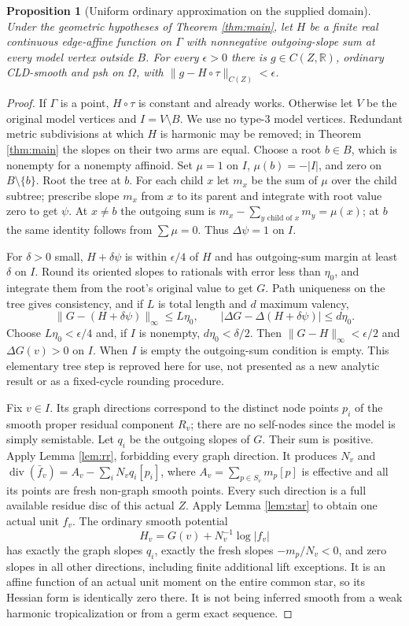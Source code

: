 \documentclass[11pt]{article}
\newtheorem{proposition}[theorem]{Proposition}
\begin{document}
\begin{proposition}[Uniform ordinary approximation on the supplied domain]\label{prop:raw}
Under the geometric hypotheses of Theorem \ref{thm:main}, let $H$
be a finite real continuous edge-affine function on $\Gamma$ with
nonnegative outgoing-slope sum at every model vertex outside $B$.
For every $\epsilon>0$ there is $g\in C(Z,\mathbb{R})$, ordinary
CLD-smooth and psh on $\Omega$, with
$\|g-H\circ\tau\|_{C(Z)}<\epsilon$.
\end{proposition}
\begin{proof}
If $\Gamma$ is a point, $H\circ\tau$ is constant and already
works. Otherwise let $V$ be the original model vertices and
$I=V\setminus B$. We use no type-3 model vertices. Redundant
metric subdivisions at which $H$ is harmonic may be removed;
in Theorem \ref{thm:main} the slopes on their two arms are equal.
Choose a root $b\in B$, which is nonempty for a nonempty
affinoid. Set $\mu=1$ on $I$, $\mu(b)=-|I|$, and zero on
$B\setminus\{b\}$. Root the tree at $b$. For each child $x$
let $m_x$ be the sum of $\mu$ over the child subtree; prescribe
slope $m_x$ from $x$ to its parent and integrate with root value
zero to get $\psi$. At $x\ne b$ the outgoing sum is
$m_x-\sum_{y\text{ child of }x}m_y=\mu(x)$; at $b$ the same
identity follows from $\sum\mu=0$. Thus $\Delta\psi=1$ on $I$.

For $\delta>0$ small, $H+\delta\psi$ is within $\epsilon/4$
of $H$ and has outgoing-sum margin at least $\delta$ on $I$.
Round its oriented slopes to rationals with error less than
$\eta_0$, and integrate them from the root's original value to
get $G$. Path uniqueness on the tree gives consistency, and if
$L$ is total length and $d$ maximum valency,
\[
 \|G-(H+\delta\psi)\|_\infty\leq L\eta_0,
 \qquad |\Delta G-\Delta(H+\delta\psi)|\leq d\eta_0.
\]
Choose $L\eta_0<\epsilon/4$ and, if $I$ is nonempty,
$d\eta_0<\delta/2$. Then
$\|G-H\|_\infty<\epsilon/2$ and $\Delta G(v)>0$ on $I$.
When $I$ is empty the outgoing-sum condition is empty.
This elementary tree step is reproved here for use, not presented
as a new analytic result or as a fixed-cycle rounding procedure.

Fix $v\in I$. Its graph directions correspond to the distinct
node points $p_i$ of the smooth proper residual component $R_v$;
there are no self-nodes since the model is simply semistable.
Let $q_i$ be the outgoing slopes of $G$. Their sum is positive.
Apply Lemma \ref{lem:rr}, forbidding every graph direction.
It produces $N_v$ and
$\operatorname{div}(\bar f_v)=A_v-\sum_i N_vq_i[p_i]$,
where $A_v=\sum_{p\in S_v}m_p[p]$ is effective and all its
points are fresh non-graph smooth points. Every such direction
is a full available residue disc of this actual $Z$.
Apply Lemma \ref{lem:star} to obtain one actual unit $f_v$.
The ordinary smooth potential
\[
                   H_v=G(v)+N_v^{-1}\log|f_v|
\]
has exactly the graph slopes $q_i$, exactly the fresh slopes
$-m_p/N_v<0$, and zero slopes in all other directions, including
finite additional lift exceptions. It is an affine function of
an actual unit moment on the entire common star, so its Hessian
form is identically zero there. It is not being inferred smooth
from a weak harmonic tropicalization or from a germ exact sequence.


\end{proof}
\end{document}
